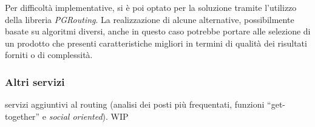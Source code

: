 Per difficoltà implementative, si è poi optato per la soluzione tramite l'utilizzo della libreria \emph{PGRouting}. La realizzazione di alcune alternative, possibilmente basate su algoritmi diversi, anche in questo caso potrebbe portare alle selezione di un prodotto che presenti caratteristiche migliori in termini di qualità dei risultati forniti o di complessità.

\subsubsection{Altri servizi}
servizi aggiuntivi al routing (analisi dei posti più frequentati, funzioni ``get-together'' e \emph{social oriented}).
WIP
